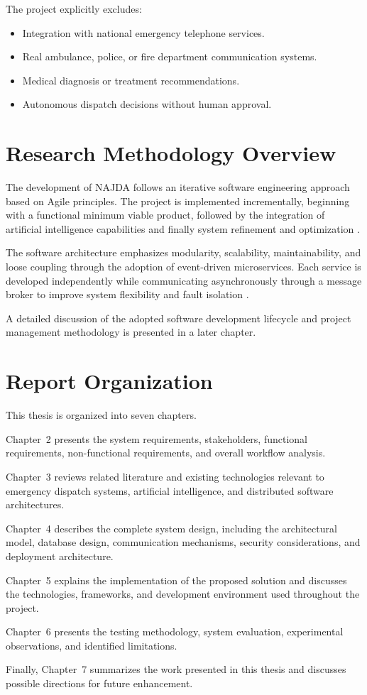 The project explicitly excludes:

\begin{itemize}
    \item Integration with national emergency telephone services.
    \item Real ambulance, police, or fire department communication systems.
    \item Medical diagnosis or treatment recommendations.
    \item Autonomous dispatch decisions without human approval.
\end{itemize}

\section{Research Methodology Overview}

The development of NAJDA follows an iterative software engineering approach based on Agile principles. The project is implemented incrementally, beginning with a functional minimum viable product, followed by the integration of artificial intelligence capabilities and finally system refinement and optimization \cite{pressman2020se}.

The software architecture emphasizes modularity, scalability, maintainability, and loose coupling through the adoption of event-driven microservices. Each service is developed independently while communicating asynchronously through a message broker to improve system flexibility and fault isolation \cite{newman2021microservices,richardson2018microservices}.

A detailed discussion of the adopted software development lifecycle and project management methodology is presented in a later chapter.

\section{Report Organization}

This thesis is organized into seven chapters.

Chapter~2 presents the system requirements, stakeholders, functional requirements, non-functional requirements, and overall workflow analysis.

Chapter~3 reviews related literature and existing technologies relevant to emergency dispatch systems, artificial intelligence, and distributed software architectures.

Chapter~4 describes the complete system design, including the architectural model, database design, communication mechanisms, security considerations, and deployment architecture.

Chapter~5 explains the implementation of the proposed solution and discusses the technologies, frameworks, and development environment used throughout the project.

Chapter~6 presents the testing methodology, system evaluation, experimental observations, and identified limitations.

Finally, Chapter~7 summarizes the work presented in this thesis and discusses possible directions for future enhancement.